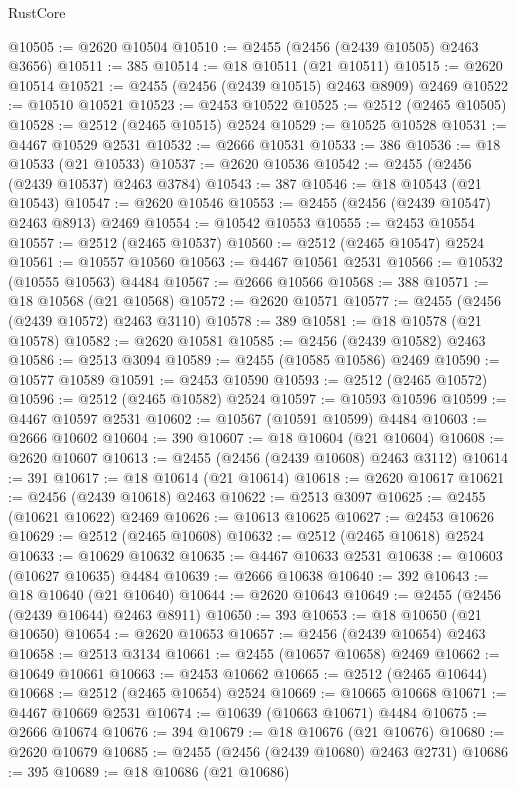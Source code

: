 \begin{lexlean}{RustCore}
\begin{coremodule}
@10505 := @2620 @10504
@10510 := @2455 (@2456 (@2439 @10505) @2463 @3656)
@10511 := 385
@10514 := @18 @10511 (@21 @10511)
@10515 := @2620 @10514
@10521 := @2455 (@2456 (@2439 @10515) @2463 @8909) @2469
@10522 := @10510 @10521
@10523 := @2453 @10522
@10525 := @2512 (@2465 @10505)
@10528 := @2512 (@2465 @10515) @2524
@10529 := @10525 @10528
@10531 := @4467 @10529 @2531
@10532 := @2666 @10531
@10533 := 386
@10536 := @18 @10533 (@21 @10533)
@10537 := @2620 @10536
@10542 := @2455 (@2456 (@2439 @10537) @2463 @3784)
@10543 := 387
@10546 := @18 @10543 (@21 @10543)
@10547 := @2620 @10546
@10553 := @2455 (@2456 (@2439 @10547) @2463 @8913) @2469
@10554 := @10542 @10553
@10555 := @2453 @10554
@10557 := @2512 (@2465 @10537)
@10560 := @2512 (@2465 @10547) @2524
@10561 := @10557 @10560
@10563 := @4467 @10561 @2531
@10566 := @10532 (@10555 @10563) @4484
@10567 := @2666 @10566
@10568 := 388
@10571 := @18 @10568 (@21 @10568)
@10572 := @2620 @10571
@10577 := @2455 (@2456 (@2439 @10572) @2463 @3110)
@10578 := 389
@10581 := @18 @10578 (@21 @10578)
@10582 := @2620 @10581
@10585 := @2456 (@2439 @10582) @2463
@10586 := @2513 @3094
@10589 := @2455 (@10585 @10586) @2469
@10590 := @10577 @10589
@10591 := @2453 @10590
@10593 := @2512 (@2465 @10572)
@10596 := @2512 (@2465 @10582) @2524
@10597 := @10593 @10596
@10599 := @4467 @10597 @2531
@10602 := @10567 (@10591 @10599) @4484
@10603 := @2666 @10602
@10604 := 390
@10607 := @18 @10604 (@21 @10604)
@10608 := @2620 @10607
@10613 := @2455 (@2456 (@2439 @10608) @2463 @3112)
@10614 := 391
@10617 := @18 @10614 (@21 @10614)
@10618 := @2620 @10617
@10621 := @2456 (@2439 @10618) @2463
@10622 := @2513 @3097
@10625 := @2455 (@10621 @10622) @2469
@10626 := @10613 @10625
@10627 := @2453 @10626
@10629 := @2512 (@2465 @10608)
@10632 := @2512 (@2465 @10618) @2524
@10633 := @10629 @10632
@10635 := @4467 @10633 @2531
@10638 := @10603 (@10627 @10635) @4484
@10639 := @2666 @10638
@10640 := 392
@10643 := @18 @10640 (@21 @10640)
@10644 := @2620 @10643
@10649 := @2455 (@2456 (@2439 @10644) @2463 @8911)
@10650 := 393
@10653 := @18 @10650 (@21 @10650)
@10654 := @2620 @10653
@10657 := @2456 (@2439 @10654) @2463
@10658 := @2513 @3134
@10661 := @2455 (@10657 @10658) @2469
@10662 := @10649 @10661
@10663 := @2453 @10662
@10665 := @2512 (@2465 @10644)
@10668 := @2512 (@2465 @10654) @2524
@10669 := @10665 @10668
@10671 := @4467 @10669 @2531
@10674 := @10639 (@10663 @10671) @4484
@10675 := @2666 @10674
@10676 := 394
@10679 := @18 @10676 (@21 @10676)
@10680 := @2620 @10679
@10685 := @2455 (@2456 (@2439 @10680) @2463 @2731)
@10686 := 395
@10689 := @18 @10686 (@21 @10686)

\end{coremodule}
\end{lexlean}
